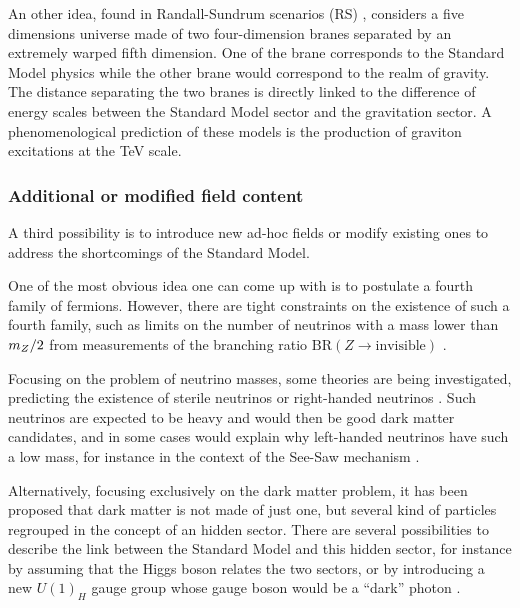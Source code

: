         An other idea, found in Randall-Sundrum scenarios (RS) \cite{RS}, considers a five
        dimensions universe made of two four-dimension branes separated by an extremely
        warped fifth dimension. One of the brane corresponds to the Standard Model physics
        while the other brane would correspond to the realm of gravity. The distance
        separating the two branes is directly linked to the difference of energy scales
        between the Standard Model sector and the gravitation sector. A phenomenological
        prediction of these models is the production of graviton excitations at the TeV
        scale.

        \subsubsection{Additional or modified field content}

        A third possibility is to introduce new ad-hoc fields or modify existing ones
        to address the shortcomings of the Standard Model.

        One of the most obvious idea
        one can come up with is to postulate a fourth family of fermions. However, there are
        tight constraints on the existence of such a fourth family, such as
        limits on the number of neutrinos with a mass lower than $m_{Z}/2$ from measurements
        of the branching ratio $\text{BR}(Z \rightarrow \text{invisible})$ \cite{PDFNumberOfNeutrinos}.

        Focusing on the problem of neutrino masses, some theories are being investigated,
        predicting the existence of sterile neutrinos or right-handed neutrinos \cite{RHNeutrinos}. Such neutrinos
        are expected to be heavy and would then be good dark matter candidates, and in some
        cases would explain why left-handed neutrinos have such a low mass, for instance
        in the context of the See-Saw mechanism \cite{Seesaw}.

        Alternatively, focusing exclusively on the dark matter problem, it has been proposed
        that dark matter is not made of just one, but several kind of particles regrouped
        in the concept of an hidden sector. There are several possibilities to describe
        the link between the Standard Model and this hidden sector, for instance by assuming
        that the Higgs boson relates the two sectors, or by introducing a new $U(1)_H$ gauge
        group whose gauge boson would be a ``dark'' photon \cite{darkPhoton}.


